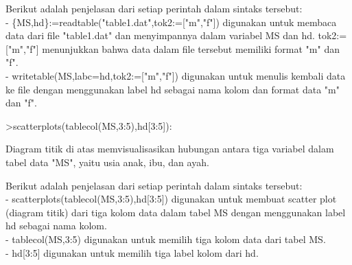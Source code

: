 \documentclass[a4paper,10pt]{article}
\begin{document}
\begin{eulernotebook}
\begin{eulercomment}
\begin{eulercomment}
\begin{eulercomment}
\begin{eulercomment}
\begin{eulercomment}
\begin{eulercomment}
\begin{eulercomment}
\begin{eulercomment}
\begin{eulercomment}
\begin{eulercomment}
\begin{eulercomment}
\begin{eulercomment}
\begin{eulercomment}
\begin{eulercomment}
\begin{eulercomment}
\begin{eulercomment}
\begin{eulercomment}
Berikut adalah penjelasan dari setiap perintah dalam sintaks tersebut:\\
- \{MS,hd\}:=readtable("table1.dat",tok2:=["m","f"]) digunakan untuk
membaca data dari file "table1.dat" dan menyimpannya dalam variabel MS
dan hd. tok2:=["m","f"] menunjukkan bahwa data dalam file tersebut
memiliki format "m" dan "f".\\
- writetable(MS,labc=hd,tok2:=["m","f"]) digunakan untuk menulis
kembali data ke file dengan menggunakan label hd sebagai nama kolom
dan format data "m" dan "f".
\end{eulercomment}
\begin{eulerprompt}
>scatterplots(tablecol(MS,3:5),hd[3:5]):
\end{eulerprompt}
\begin{eulercomment}
Diagram titik di atas  memvisualisasikan hubungan antara tiga variabel
dalam tabel data "MS", yaitu usia anak, ibu, dan ayah.

Berikut adalah penjelasan dari setiap perintah dalam sintaks tersebut:\\
- scatterplots(tablecol(MS,3:5),hd[3:5]) digunakan untuk membuat
scatter plot (diagram titik) dari tiga kolom data dalam tabel MS
dengan menggunakan label hd sebagai nama kolom.\\
- tablecol(MS,3:5) digunakan untuk memilih tiga kolom data dari tabel
MS.\\
- hd[3:5] digunakan untuk memilih tiga label kolom dari hd.


\end{eulercomment}
\end{eulercomment}
\end{eulercomment}
\end{eulercomment}
\end{eulercomment}
\end{eulercomment}
\end{eulercomment}
\end{eulercomment}
\end{eulercomment}
\end{eulercomment}
\end{eulercomment}
\end{eulercomment}
\end{eulercomment}
\end{eulercomment}
\end{eulercomment}
\end{eulercomment}
\end{eulercomment}
\end{eulernotebook}
\end{document}
